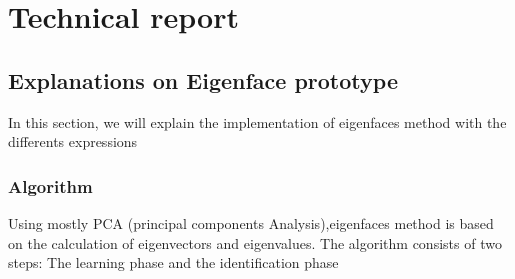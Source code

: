 \chapter{Technical report}



\section{Explanations on Eigenface prototype}
In this section, we will explain the implementation of  eigenfaces  method  with the differents expressions  
\subsection{Algorithm}
Using mostly PCA (principal components Analysis),eigenfaces method is based on the calculation of eigenvectors and eigenvalues.
The algorithm consists of two steps: The learning phase and the identification phase

